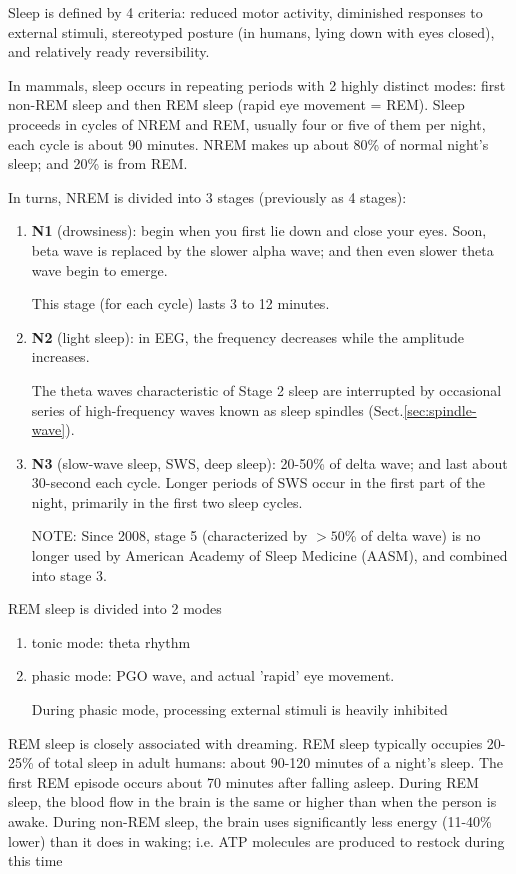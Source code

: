 Sleep is defined by 4 criteria: reduced motor activity, diminished responses to
external stimuli, stereotyped posture (in humans, lying down with eyes closed),
and relatively ready reversibility. 

In mammals, sleep occurs in repeating periods with 2 highly distinct modes:
first non-REM sleep and then REM sleep (rapid eye movement = REM). Sleep
proceeds in cycles of NREM and REM, usually four or five of them per night, each
cycle is about 90 minutes. NREM makes up about 80\% of normal night's sleep; and
20\% is from REM.


In turns, NREM is divided into 3 stages (previously as 4 stages):
\begin{enumerate}
  \item {\bf N1} (drowsiness): begin when you first lie down and close your
  eyes.
  Soon, beta wave is replaced by the slower alpha wave; and then even slower theta wave
  begin to emerge.
  
This stage (for each cycle) lasts 3 to 12 minutes.
  
  \item {\bf N2} (light sleep): in EEG, the frequency decreases while the
  amplitude increases.
  
The theta waves characteristic of Stage 2 sleep are interrupted by occasional
series of high-frequency waves known as sleep spindles
(Sect.\ref{sec:spindle-wave}).
  
  \item {\bf N3} (slow-wave sleep, SWS, deep sleep): 20-50\% of delta wave; and
  last about 30-second each cycle. Longer periods of SWS occur in the first part
  of the night, primarily in the first two sleep cycles.
  
NOTE: Since 2008, stage 5 (characterized by $> 50$\% of delta wave) is no longer
used by  American Academy of Sleep Medicine (AASM), and combined into stage 3.
\end{enumerate}

REM sleep is divided into 2 modes
\begin{enumerate}
  \item tonic mode: theta rhythm
  
  \item phasic mode: PGO wave, and actual 'rapid' eye movement.
  
During phasic mode, processing external stimuli is heavily inhibited
\end{enumerate}

REM sleep is closely associated with dreaming. REM sleep typically occupies
20-25\% of total sleep in adult humans: about 90-120 minutes of a night's sleep.
The first REM episode occurs about 70 minutes after falling asleep.
During REM sleep, the blood flow in the brain is the same or higher than when
the person is awake.  During non-REM sleep, the brain uses significantly less
energy (11-40\% lower) than it does in waking; i.e. ATP molecules are produced
to restock during this time


